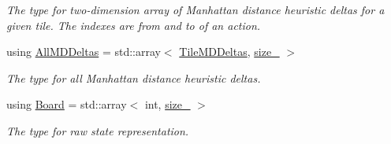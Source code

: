 \begin{DoxyCompactItemize}
\begin{DoxyCompactList}\small\item\em The type for two-\/dimension array of Manhattan distance heuristic deltas for a given tile. The indexes are from and to of an action. \end{DoxyCompactList}\item 
using \hyperlink{structslb_1_1ext_1_1domain_1_1sliding__tile_1_1SlidingTile_a82f77d8b64d6c82de4df1ff94b617df8}{All\+M\+D\+Deltas} = std\+::array$<$ \hyperlink{structslb_1_1ext_1_1domain_1_1sliding__tile_1_1SlidingTile_a8c5cc54788024fdb2dc215414174a4d0}{Tile\+M\+D\+Deltas}, \hyperlink{structslb_1_1ext_1_1domain_1_1sliding__tile_1_1SlidingTile_a9a400ee0feba20908873e59620cff314}{size\+\_\+} $>$\hypertarget{structslb_1_1ext_1_1domain_1_1sliding__tile_1_1SlidingTile_a82f77d8b64d6c82de4df1ff94b617df8}{}\label{structslb_1_1ext_1_1domain_1_1sliding__tile_1_1SlidingTile_a82f77d8b64d6c82de4df1ff94b617df8}

\begin{DoxyCompactList}\small\item\em The type for all Manhattan distance heuristic deltas. \end{DoxyCompactList}\item 
using \hyperlink{structslb_1_1ext_1_1domain_1_1sliding__tile_1_1SlidingTile_aee77712842dd1a7162a343422b84e751}{Board} = std\+::array$<$ int, \hyperlink{structslb_1_1ext_1_1domain_1_1sliding__tile_1_1SlidingTile_a9a400ee0feba20908873e59620cff314}{size\+\_\+} $>$\hypertarget{structslb_1_1ext_1_1domain_1_1sliding__tile_1_1SlidingTile_aee77712842dd1a7162a343422b84e751}{}\label{structslb_1_1ext_1_1domain_1_1sliding__tile_1_1SlidingTile_aee77712842dd1a7162a343422b84e751}

\begin{DoxyCompactList}\small\item\em The type for raw state representation. \end{DoxyCompactList}\end{DoxyCompactItemize}
